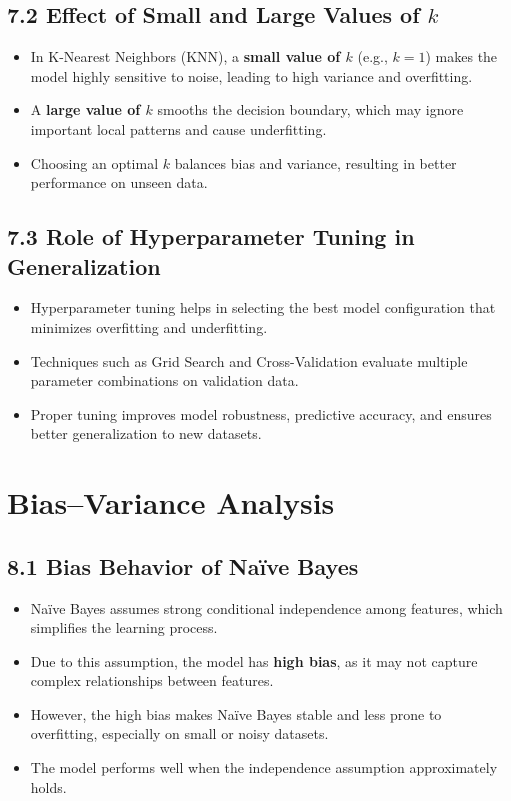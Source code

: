 \documentclass[11pt]{article}
\begin{document}
\subsection*{7.2 Effect of Small and Large Values of $k$}
\begin{itemize}
    \item In K-Nearest Neighbors (KNN), a \textbf{small value of $k$} (e.g., $k=1$) makes the model highly sensitive to noise, leading to high variance and overfitting.
    \item A \textbf{large value of $k$} smooths the decision boundary, which may ignore important local patterns and cause underfitting.
    \item Choosing an optimal $k$ balances bias and variance, resulting in better performance on unseen data.
\end{itemize}

\subsection*{7.3 Role of Hyperparameter Tuning in Generalization}
\begin{itemize}
    \item Hyperparameter tuning helps in selecting the best model configuration that minimizes overfitting and underfitting.
    \item Techniques such as Grid Search and Cross-Validation evaluate multiple parameter combinations on validation data.
    \item Proper tuning improves model robustness, predictive accuracy, and ensures better generalization to new datasets.
\end{itemize}


\section{Bias--Variance Analysis}
\subsection*{8.1 Bias Behavior of Na\"ive Bayes}
\begin{itemize}
    \item Na\"ive Bayes assumes strong conditional independence among features, which simplifies the learning process.
    \item Due to this assumption, the model has \textbf{high bias}, as it may not capture complex relationships between features.
    \item However, the high bias makes Na\"ive Bayes stable and less prone to overfitting, especially on small or noisy datasets.
    \item The model performs well when the independence assumption approximately holds.
\end{itemize}
\end{document}

